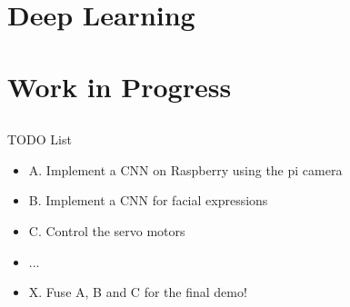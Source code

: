 \documentclass[compress]{beamer}
\begin{document}
\section{Deep Learning}


\subsection{}


\subsection{}



\subsection{}




\section{Work in Progress}


\subsection{}
{
\begin{frame}{TODO List}


          \begin{itemize}
              \item A. Implement a CNN on Raspberry using the pi camera
              \item B. Implement a CNN for facial expressions
              \item C. Control the servo motors
              \item ...
              \item X. Fuse A, B and C for the final demo!
          \end{itemize}

\end{frame}
}
\end{document}
